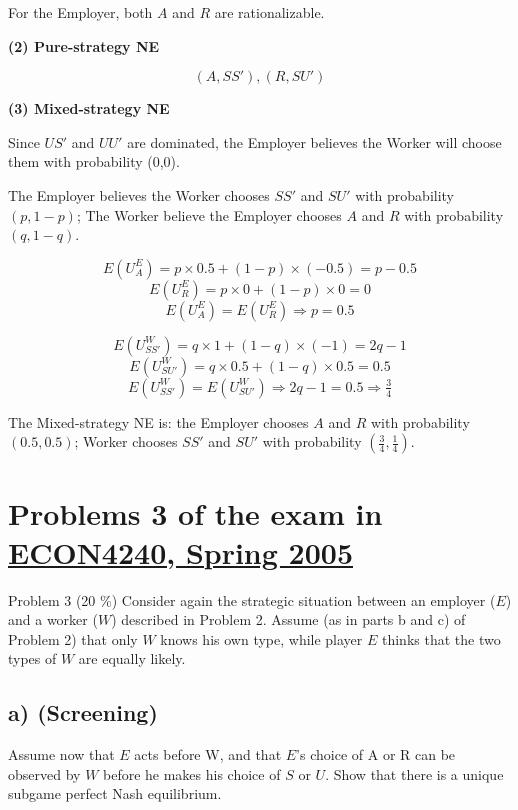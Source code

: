 \documentclass{article}
\begin{document}
\medskip

For the Employer, both $A$ and $R$ are rationalizable.

\medskip

\textbf{(2) Pure-strategy NE}

$$(A,SS'),(R,SU')$$

\smallskip

\textbf{(3) Mixed-strategy NE}

\medskip

Since $US'$ and $UU'$ are dominated, the Employer believes the Worker will choose 
them with probability (0,0).

\medskip

The Employer believes the Worker chooses $SS'$ and $SU'$ with probability $(p,1-p)$;
The Worker believe the Employer chooses $A$ and $R$ with probability $(q,1-q)$.

$$E(U^E_A) = p \times 0.5 + (1-p) \times (-0.5) = p-0.5$$
$$E(U^E_R) = p \times 0 + (1-p) \times 0 = 0$$
$$E(U^E_A) = E(U^E_R) \Rightarrow p=0.5$$


$$E(U^W_{SS'}) = q \times 1 + (1-q) \times (-1) = 2q-1$$
$$E(U^W_{SU'}) = q \times 0.5 + (1-q) \times 0.5 = 0.5$$
$$E(U^W_{SS'}) = E(U^W_{SU'}) \Rightarrow 2q-1=0.5 \Rightarrow \tfrac34$$

The Mixed-strategy NE is: the Employer chooses $A$ and $R$ with probability $(0.5,0.5)$; Worker chooses $SS'$ and $SU'$ with probability $(\tfrac34,\tfrac14)$.


\section{Problems 3  of the exam in \href{https://www.uio.no/studier/emner/sv/oekonomi/ECON4240/previous-exams/}{ECON4240, Spring 2005}}

Problem 3 (20 \%)
Consider again the strategic situation between an employer ($E$) and a worker ($W$) described in
Problem 2. Assume (as in parts b and c) of Problem 2) that only $W$ knows his own type, while
player $E$ thinks that the two types of $W$ are equally likely.

\subsection*{a) (Screening)} Assume now that $E$ acts before W, and that $E$'s choice of A or R can be
observed by $W$ before he makes his choice of $S$ or $U$. Show that there is a unique
subgame perfect Nash equilibrium.
\end{document}
